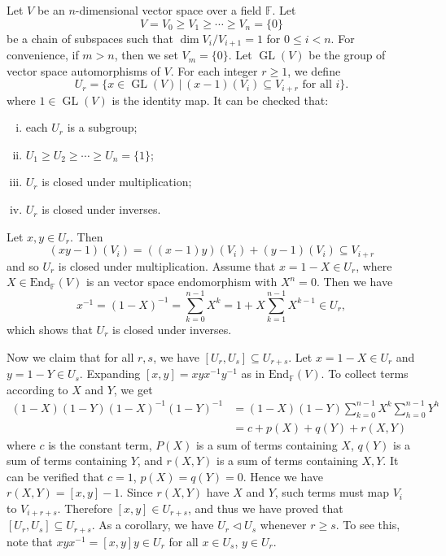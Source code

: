 \begin{example}
	Let $V$ be an $n$-dimensional vector space over a field $\mathbb{F}$. Let 
	$$V = V_0 \geq  V_1 \geq \cdots \geq V_n = \{0\}$$
	be a chain of subspaces such that 
	$
	\dim V_i/V_{i+1} = 1 
	$
	for $0\leq i< n$.
	For convenience, if $m > n$, then we set $V_m = \{0\}$. Let $\operatorname{GL}(V)$ be the group of vector space automorphisms of $V$. For each integer $r\geq 1$, we  define
	\begin{equation*}
		U_r = \{x \in \operatorname{GL}(V) \,|\,  (x-1)(V_i) \subseteq V_{i+r}\text{ for all }i\}.
	\end{equation*}
	where $1\in  \operatorname{GL}(V)$ is the identity map. It can be checked that:
	\begin{enumerate}[(i)]
		\item each $U_r$ is a subgroup;
		\item $U_1 \geq U_2 \geq \cdots \geq U_n = \{1\}$;
		\item $U_r$ is closed under multiplication;
		\item $U_r$ is closed under inverses.
	\end{enumerate}
	Let $x, y \in U_r$. Then 
	\begin{equation*}
		(xy-1)(V_i) = ((x-1)y)(V_i) + (y-1)(V_i)\subseteq V_{i+r}
	\end{equation*} and so $U_r$ is closed under multiplication. Assume that $x=1-X \in U_r$, where $X \in \text{End}_{\mathbb{F}}(V)$ is an vector space endomorphism with $X^n=0$. Then we have
	$$x^{-1} = (1-X)^{-1} = \sum_{k=0}^{n-1} X^k = 1+X\sum_{k=1}^{n-1}X^{k-1} \in U_r,$$
	which shows that $U_r$ is closed under inverses. 
	
	Now we claim that for all $r, s$, we have $[U_r, U_s] \subseteq U_{r+s}$. Let $x = 1-X \in U_r$ and $y = 1-Y \in U_s$. Expanding $[x,y] = xyx^{-1}y^{-1}$ as in $\text{End}_{\mathbb{F}}(V)$. To collect terms according to $X$ and $Y$, we get
	\begin{align*}
		(1-X)	(1-Y)(1-X)^{-1}(1-Y)^{-1} &= (1-X)(1-Y) \sum_{k=0}^{n-1} X^k\sum_{h=0}^{n-1}  Y^h
		\\
		&= c + p(X) + q(Y) + r(X,Y)
	\end{align*}
	where $c$ is the constant term, $P(X)$ is a sum of terms containing $X$, $q(Y)$ is a sum of terms containing $Y$, and $r(X,Y)$ is a sum of terms containing $X,Y$. It can be verified that $c = 1$, $p(X) = q(Y) = 0$. Hence we have $r(X,Y) = [x,y]-1$. Since $r(X,Y)$ have $X$ and $Y$, such terms must map $V_i$ to $V_{i+r+s}$. Therefore $[x,y]\in U_{r+s}$, and thus we have proved that $[U_r, U_s] \subseteq U_{r+s}$. As a corollary, we have $U_r \lhd U_s$ whenever $r \geq s$. To see this, note that  $xyx^{-1} = [x,y]y\in U_r$ for all $x\in U_s$, $y\in U_r$. 
	

\end{example}
